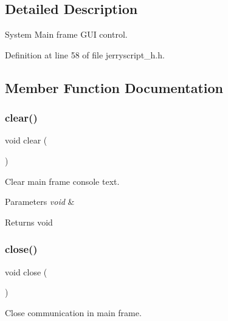 \subsection{Detailed Description}
System Main frame G\+UI control. 

Definition at line 58 of file jerryscript\+\_\+h.\+h.



\subsection{Member Function Documentation}
\mbox{\label{classmain__frame_ae683fe63c33c388e9ba1c6392dd477eb}} 
\subsubsection{clear()}
{\footnotesize\ttfamily void clear (\begin{DoxyParamCaption}\item[{void}]{ }\end{DoxyParamCaption})}



Clear main frame console text. 


\begin{DoxyCode}{0}
\end{DoxyCode}



\begin{DoxyParams}{Parameters}
{\em void} & \\
\hline
\end{DoxyParams}
\begin{DoxyReturn}{Returns}
void 
\end{DoxyReturn}
\mbox{\label{classmain__frame_a67b72387b99fb35706b11eeba7070bc4}} 
\subsubsection{close()}
{\footnotesize\ttfamily void close (\begin{DoxyParamCaption}\item[{void}]{ }\end{DoxyParamCaption})}



Close communication in main frame. 


